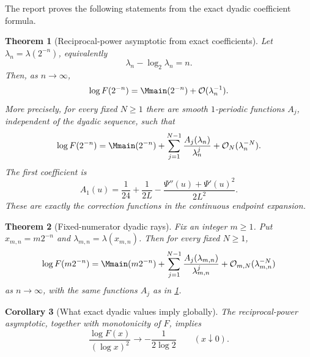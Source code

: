 \documentclass[11pt,oneside]{article}
\newtheorem{theorem}{Theorem}[section]
\newtheorem{corollary}[theorem]{Corollary}
\theoremstyle{definition}
\theoremstyle{remark}
\newcommand{\bigO}{\mathcal O}
\begin{document}
The report proves the following statements from the exact dyadic coefficient formula.

\begin{theorem}[Reciprocal-power asymptotic from exact coefficients]
\label{dyadicasymbridge:thm:main-inverse}
Let $\lambda_n=\lambda(2^{-n})$, equivalently
\begin{equation}
 \lambda_n-\log_2\lambda_n=n.
\label{dyadicasymbridge:eq:lambda-n-equation}
\end{equation}
Then, as $n\to\infty$,
\begin{equation}
 \log F(2^{-n})=\Mmain(2^{-n})+\bigO(\lambda_n^{-1}).
\label{dyadicasymbridge:eq:main-inverse-leading}
\end{equation}
More precisely, for every fixed $N\ge1$ there are smooth $1$-periodic functions
$A_j$, independent of the dyadic sequence, such that
\begin{equation}
 \log F(2^{-n})=
 \Mmain(2^{-n})+
 \sum_{j=1}^{N-1}\frac{A_j(\lambda_n)}{\lambda_n^j}
 +\bigO_N(\lambda_n^{-N}).
\label{dyadicasymbridge:eq:main-inverse-all}
\end{equation}
The first coefficient is
\begin{equation}
 A_1(u)=\frac1{24}+\frac1{2L}
 -\frac{\Psi''(u)+\Psi'(u)^2}{2L^2}.
\label{dyadicasymbridge:eq:A1}
\end{equation}
These are exactly the correction functions in the continuous endpoint expansion.
\end{theorem}

\begin{theorem}[Fixed-numerator dyadic rays]
\label{dyadicasymbridge:thm:main-fixed-m}
Fix an integer $m\ge1$.  Put $x_{m,n}=m2^{-n}$ and
$\lambda_{m,n}=\lambda(x_{m,n})$.  Then for every fixed $N\ge1$,
\begin{equation}
 \log F(m2^{-n})=
 \Mmain(m2^{-n})+
 \sum_{j=1}^{N-1}\frac{A_j(\lambda_{m,n})}{\lambda_{m,n}^j}
 +\bigO_{m,N}(\lambda_{m,n}^{-N})
\label{dyadicasymbridge:eq:main-fixed-m}
\end{equation}
as $n\to\infty$, with the same functions $A_j$ as in
\cref{dyadicasymbridge:thm:main-inverse}.
\end{theorem}

\begin{corollary}[What exact dyadic values imply globally]
\label{dyadicasymbridge:cor:global-leading}
The reciprocal-power asymptotic, together with monotonicity of $F$, implies
\begin{equation}
 \frac{\log F(x)}{(\log x)^2}\longrightarrow-\frac1{2\log2}
 \qquad(x\downarrow0).
\label{dyadicasymbridge:eq:global-quadratic-law}
\end{equation}
\end{corollary}
\end{document}
